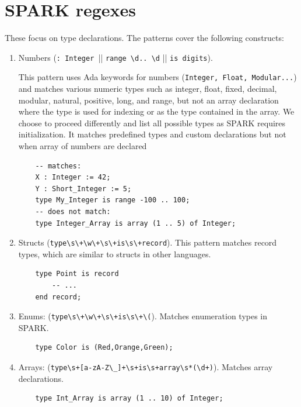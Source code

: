 \documentclass[nomenclature, english, bibtex]{kththesis}
\begin{document}
{\section{SPARK regexes}

These focus on type declarations.
The patterns cover the following constructs:

\begin{enumerate}
    \item Numbers 
(\verb|: Integer ||| \verb|range \d.. \d| || \verb|is digits|).

This pattern uses Ada keywords for numbers (\texttt{Integer, Float, Modular...}) and matches various numeric types such as integer, float, fixed, decimal, modular, natural, positive, long, and range, but not an array declaration where the type is used for indexing or as the type contained in the array. We choose to proceed differently and list all possible types as SPARK requires initialization. It matches predefined types and custom declarations but not when array of numbers are declared

    \begin{verbatim}
    -- matches:
    X : Integer := 42;
    Y : Short_Integer := 5;
    type My_Integer is range -100 .. 100;
    -- does not match:
    type Integer_Array is array (1 .. 5) of Integer;
    \end{verbatim}

    \item Structs (\verb|type\s\+\w\+\s\+is\s\+record|). This pattern matches record types, which are similar to structs in other languages.

    \begin{verbatim}
    type Point is record
        -- ...
    end record;
    \end{verbatim}

    \item Enums: (\verb|type\s\+\w\+\s\+is\s\+\(|). Matches enumeration types in SPARK.

    \begin{verbatim}
    type Color is (Red,Orange,Green);
    \end{verbatim}

    \item Arrays: (\verb|type\s+[a-zA-Z\_]+\s+is\s+array\s*(\d+)|). Matches array declarations.

    \begin{verbatim}
    type Int_Array is array (1 .. 10) of Integer;
    \end{verbatim}


\end{enumerate}}
\end{document}
